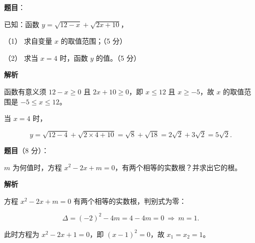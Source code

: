 \begin{answer}

\textbf{题目}：

已知：函数 $y=\sqrt{12-x}+\sqrt{2x+10}$，

（1） 求自变量 $x$ 的取值范围；（5 分）

（2） 求当 $x=4$ 时，函数 $y$ 的值。（5 分）

\textbf{解析}


函数有意义须 $12-x\ge0$ 且 $2x+10\ge0$，即 $x\le12$ 且 $x\ge-5$，故 $x$ 的取值范围是 $-5\le x\le12$。


当 $x=4$ 时，

\nopagebreak[4]
\[
y=\sqrt{12-4}+\sqrt{2\times4+10}=\sqrt8+\sqrt{18}=2\sqrt2+3\sqrt2=5\sqrt2.
\]



\end{answer}
\begin{answer}

\textbf{题目}（8 分）：

$m$ 为何值时，方程 $x^2-2x+m=0$，有两个相等的实数根？并求出它的根。

\textbf{解析}

方程 $x^2-2x+m=0$ 有两个相等的实数根，判别式为零：

\nopagebreak[4]
\[
\Delta=(-2)^2-4m=4-4m=0\ \Longrightarrow\ m=1.
\]

此时方程为 $x^2-2x+1=0$，即 $(x-1)^2=0$，故 $x_1=x_2=1$。


\end{answer}

